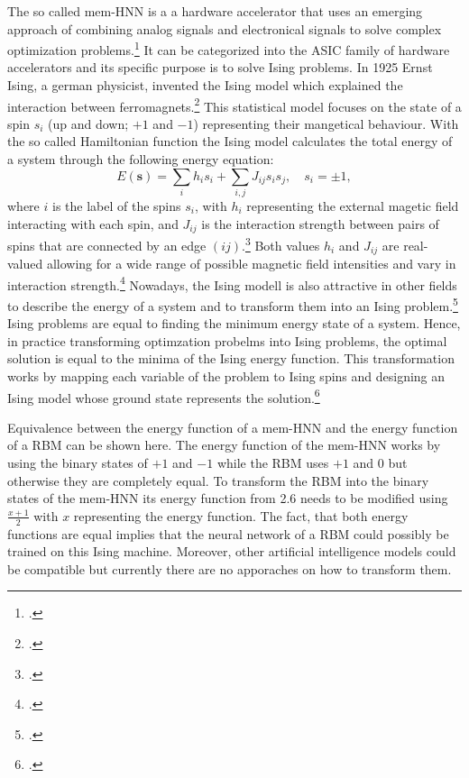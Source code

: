 The so called \ac{mem-HNN} is a a hardware accelerator that uses an emerging approach of combining analog signals and electronical signals to solve complex optimization problems.\footcite[cf.][410]{caiPowerefficientCombinatorialOptimization2020}
It can be categorized into the \ac{ASIC} family of hardware accelerators and its specific purpose is to solve Ising problems. 
In 1925 Ernst Ising, a german physicist, invented the Ising model which explained the interaction between ferromagnets.\footcite[cf.][253-258]{isingBeitragZurTheorie1925}
This statistical model focuses on the state of a spin \( s_{i} \) (up and down; \( +1 \) and \( -1 \)) representing their mangetical behaviour. 
With the so called Hamiltonian function the Ising model calculates the total energy of a system through the following energy equation:
\begin{equation}
    E(\mathbf{s}) = \sum_{i } h_i s_i + \sum_{i,j} J_{ij}s_{i}s_{j}, \quad s_i = \pm 1,
\end{equation}
where \( i \) is the label of the spins \( s_{i} \), with \( h_{i} \) representing the external magetic field  interacting with each spin, and \( J_{ij} \) is the interaction strength between pairs of spins that are connected by an edge \( (ij) \).\footcite[cf.][2]{tanahashiApplicationIsingMachines2019}
Both values \( h_{i} \) and  \( J_{ij} \) are real-valued allowing for a wide range of possible magnetic field intensities and vary in interaction strength.\footcite[cf.][1-2]{wangOscillatorbasedIsingMachine2017}
Nowadays, the Ising modell is also attractive in other fields to describe the energy of a system and to transform them into an Ising problem.\footcite[cf.][2-3]{tanahashiApplicationIsingMachines2019}
Ising problems are equal to finding the minimum energy state of a system.
Hence, in practice transforming optimzation probelms into Ising problems, the optimal solution is equal to the minima of the Ising energy function. 
This transformation works by mapping each variable of the problem to Ising spins and designing an Ising model whose ground state represents the solution.\footcite[cf.][2-3]{lucasIsingFormulationsMany2014}

Equivalence between the energy function of a \ac{mem-HNN} and the energy function of a \ac{RBM} can be shown here.
The energy function of the \ac{mem-HNN} works by using the binary states of \( +1 \) and \( -1 \) while the \ac{RBM} uses \( +1 \) and \( 0 \) but otherwise they are completely equal.
To transform the \ac{RBM} into the binary states of the \ac{mem-HNN} its energy function from 2.6 needs to be modified using \(\frac{x + 1}{2}\) with  \( x \) representing the energy function.
The fact, that both energy functions are equal implies that the neural network of a \ac{RBM} could possibly be trained on this Ising machine.
Moreover, other artificial intelligence models could be compatible but currently there are no apporaches on how to transform them.

